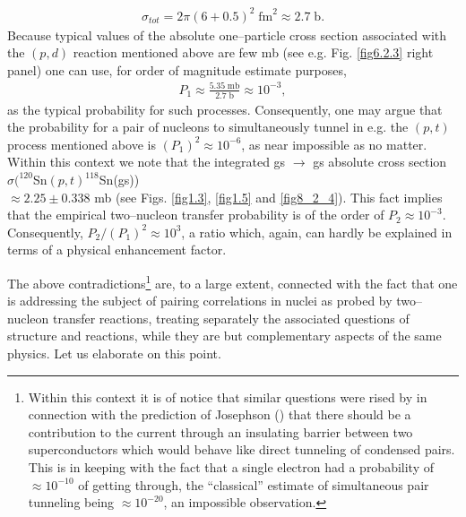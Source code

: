 \begin{align}
\sigma_{tot}=2\pi(6+0.5)^2\;\text{fm}^2\approx 2.7\;\text{b}.
\end{align}
Because typical values of the absolute one--particle cross section associated  with the $(p,d)$ reaction mentioned above are few mb (see e.g. Fig. \ref{fig6.2.3} right panel) one can use, for order of magnitude estimate purposes,  
\begin{align}
P_1\approx\frac{5.35\; \text{mb}}{2.7\;\text{b}}\approx 10^{-3},
\end{align}
as the typical probability for such processes. Consequently, one may argue that the probability for a  pair of nucleons to simultaneously tunnel in e.g. the $(p,t)$ process mentioned above is $(P_1)^2\approx10^{-6}$, as near impossible as no matter. Within this context we note that the integrated gs $\rightarrow$ gs absolute cross section $\sigma(^{120}$Sn$(p,t)^{118}$Sn(gs))\\$\approx 2.25 \pm$0.338 mb (see Figs. \ref{fig1.3}, \ref{fig1.5} and \ref{fig8_2_4}). This fact implies that the empirical two--nucleon transfer probability is of the order of $P_2\approx 10^{-3}$. Consequently, $P_2/(P_1)^2\approx 10^{3}$, a ratio which, again, can hardly be explained in terms of a physical enhancement factor.


The above contradictions\footnote{Within this context it is of notice that similar questions were rised by \cite{Bardeen:62,Bardeen:61,Pippard:12,Cohen:62,McDonald:01} in connection with the prediction of Josephson (\cite{Josephson:62}) that there should be a contribution to the current through an insulating barrier between two superconductors which would behave like direct tunneling of condensed pairs. This is in keeping with the fact that a single electron had a probability of $\approx 10^{-10}$ of getting through, the ``classical'' estimate of simultaneous pair tunneling being $\approx 10^{-20}$, an impossible observation.}  are, to a large extent, connected with the fact that one is addressing the subject of pairing correlations in nuclei as probed by two--nucleon transfer reactions, treating separately the associated questions of structure and reactions, while they are but complementary aspects of the same physics. Let us elaborate on this point. 



